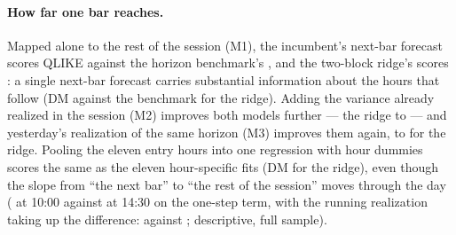 \begin{table}[H]
\centering
\caption{Multi-horizon forecasts of the variance remaining in the
session, pooled over entry hours 10:00--15:00~ET (one loss per session,
the mean over the eleven entry hours). QLIKE on remaining variance of
each forecast as its regression gives it (exponentiated, no rescale),
lower is better. DM~$t$ (ridge vs.\ incumbent) is the paired
Diebold--Mariano statistic of the two-block ridge against the OLS--HAR
incumbent under the same construction; DM~$t$ (vs.\ benchmark) is the
two-block ridge against the horizon-specific unconditional benchmark.
Negative favours the ridge. All constructions use only information
available at the entry bar.
\label{tab:multihorizon_pooled}}
\end{table}

\paragraph{How far one bar reaches.} Mapped alone to the rest of the
session (M1), the incumbent's next-bar forecast scores QLIKE
\mhAzeroMOneQLIKE{} against the horizon benchmark's \mhNaiveQLIKE{},
and the two-block ridge's scores \mhBlkMOneQLIKE{}: a single next-bar
forecast carries substantial information about the hours that follow
(DM \mhBlkMOneDMVsNaive{} against the benchmark for the ridge). Adding
the variance already realized in the session (M2) improves both models
further --- the ridge to \mhBlkMTwoQLIKE{} --- and yesterday's
realization of the same horizon (M3) improves them again, to
\mhBlkMThreeQLIKE{} for the ridge. Pooling the eleven entry hours into
one regression with hour dummies scores the same as the eleven
hour-specific fits (DM \mhPooledVsPerHourBlk{} for the ridge), even
though the slope from ``the next bar'' to ``the rest of the session''
moves through the day (\mhBlkSlopeOnestepEarly{} at 10:00 against
\mhBlkSlopeOnestepLate{} at 14:30 on the one-step term, with the
running realization taking up the difference: \mhBlkSlopeSofarEarly{}
against \mhBlkSlopeSofarLate{}; descriptive, full sample).

